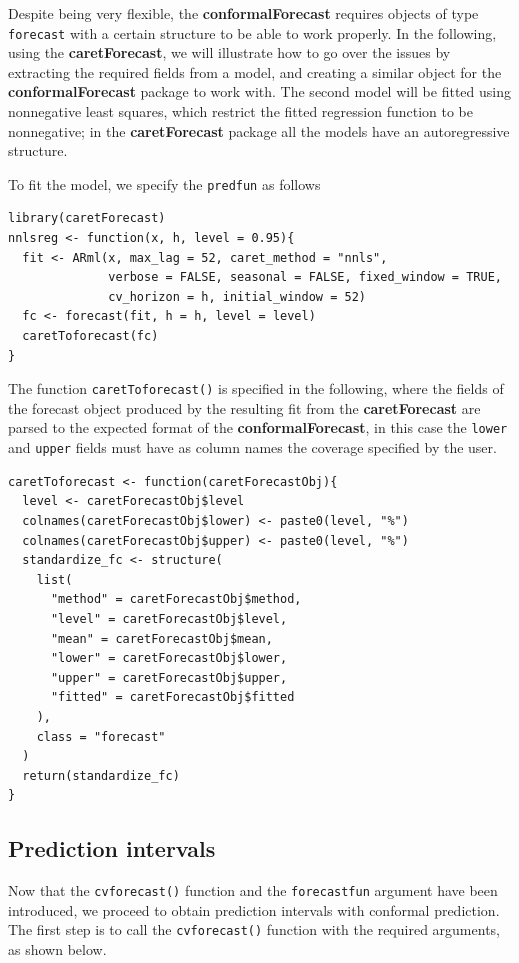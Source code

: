 Despite being very flexible, the \textbf{conformalForecast} requires objects
of type \texttt{forecast} with a certain structure to be able to work properly.
In the following, using the \textbf{caretForecast}, we will illustrate how to
go over the issues by extracting the required fields from a model, and
creating a similar object for the \textbf{conformalForecast} package to work
with. The second model will be fitted using nonnegative least squares,
which restrict the fitted regression function to be nonnegative; in the
\textbf{caretForecast} package all the models have an autoregressive
structure.

To fit the model, we specify the \texttt{predfun} as follows

\begin{verbatim}
library(caretForecast)
nnlsreg <- function(x, h, level = 0.95){
  fit <- ARml(x, max_lag = 52, caret_method = "nnls", 
              verbose = FALSE, seasonal = FALSE, fixed_window = TRUE, 
              cv_horizon = h, initial_window = 52)
  fc <- forecast(fit, h = h, level = level)
  caretToforecast(fc)
}
\end{verbatim}

The function \texttt{caretToforecast()} is specified in the following, where
the fields of the forecast object produced by the resulting fit from the
\textbf{caretForecast} are parsed to the expected format of the
\textbf{conformalForecast}, in this case the \texttt{lower} and \texttt{upper} fields must
have as column names the coverage specified by the user.

\begin{verbatim}
caretToforecast <- function(caretForecastObj){
  level <- caretForecastObj$level
  colnames(caretForecastObj$lower) <- paste0(level, "%")
  colnames(caretForecastObj$upper) <- paste0(level, "%")
  standardize_fc <- structure(
    list(
      "method" = caretForecastObj$method,
      "level" = caretForecastObj$level,
      "mean" = caretForecastObj$mean,
      "lower" = caretForecastObj$lower,
      "upper" = caretForecastObj$upper,
      "fitted" = caretForecastObj$fitted
    ),
    class = "forecast"
  )
  return(standardize_fc)
}
\end{verbatim}

\subsection{Prediction intervals}\label{prediction-bands-section}

Now that the \texttt{cvforecast()} function and the \texttt{forecastfun} argument have
been introduced, we proceed to obtain prediction intervals with
conformal prediction. The first step is to call the \texttt{cvforecast()}
function with the required arguments, as shown below.

